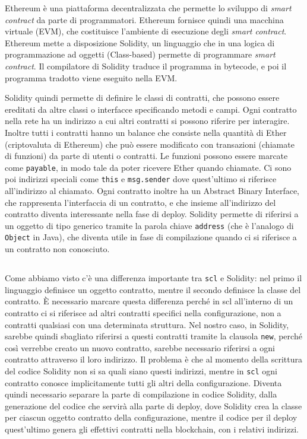 \documentclass[]{article}
\begin{document}
Ethereum è una piattaforma decentralizzata che permette lo sviluppo di
\emph{smart contract} da parte di programmatori. Ethereum fornisce
quindi una macchina virtuale (EVM), che costituisce l'ambiente di
esecuzione degli \emph{smart contract}. Ethereum mette a disposizione
Solidity, un linguaggio che in una logica di programmazione ad oggetti
(Class-based) permette di programmare \emph{smart contract}. Il
compilatore di Solidity traduce il programma in bytecode, e poi il
programma tradotto viene eseguito nella EVM.

Solidity quindi permette di definire le classi di contratti, che possono
essere ereditati da altre classi o interfacce specificando metodi e
campi. Ogni contratto nella rete ha un indirizzo a cui altri contratti
si possono riferire per interagire. Inoltre tutti i contratti hanno un
balance che consiste nella quantità di Ether (criptovaluta di Ethereum)
che può essere modificato con transazioni (chiamate di funzioni) da
parte di utenti o contratti. Le funzioni possono essere marcate come
\texttt{payable}, in modo tale da poter ricevere Ether quando chiamate.
Ci sono poi indirizzi speciali come \texttt{this} e \texttt{msg.sender}
dove quest'ultimo si riferisce all'indirizzo al chiamato. Ogni contratto
inoltre ha un Abstract Binary Interface, che rappresenta l'interfaccia
di un contratto, e che insieme all'indirizzo del contratto diventa
interessante nella fase di deploy. Solidity permette di riferirsi a un
oggetto di tipo generico tramite la parola chiave \texttt{address} (che
è l'analogo di \texttt{Object} in Java), che diventa utile in fase di
compilazione quando ci si riferisce a un contratto non conosciuto.

\hypertarget{section-1}{%
\subsection{}\label{section-1}}

Come abbiamo visto c'è una differenza importante tra \texttt{scl} e
Solidity: nel primo il linguaggio definisce un oggetto contratto, mentre
il secondo definisce la classe del contratto. È necessario marcare
questa differenza perché in scl all'interno di un contratto ci si
riferisce ad altri contratti specifici nella configurazione, non a
contratti qualsiasi con una determinata struttura. Nel nostro caso, in
Solidity, sarebbe quindi sbagliato riferirsi a questi contratti tramite
la clausola \texttt{new}, perché così verrebbe creato un nuovo
contratto, sarebbe necessario riferirsi a ogni contratto attraverso il
loro indirizzo. Il problema è che al momento della scrittura del codice
Solidity non si sa quali siano questi indirizzi, mentre in \texttt{scl}
ogni contratto conosce implicitamente tutti gli altri della
configurazione. Diventa quindi necessario separare la parte di
compilazione in codice Solidity, dalla generazione del codice che
servirà alla parte di deploy, dove Solidity crea la classe per ciascun
oggetto contratto della configurazione, mentre il codice per il deploy
quest'ultimo genera gli effettivi contratti nella blockchain, con i
relativi indirizzi.
\end{document}
